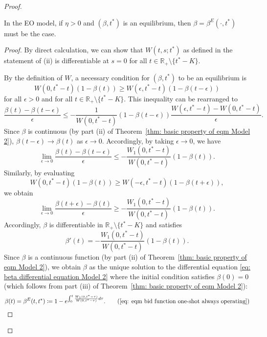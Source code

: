 \documentclass[12pt, letterpaper]{article}
\begin{document}
\begin{proof}
\begin{lem}\label{lem: equilibrium necessity model 2}
In the EO model, if $\eta > 0$ and $(\beta, t^*)$ is an equilibrium, then $\beta = \beta^E(\cdot, t^*)$ must be the case.
\end{lem}

\begin{proof}
By direct calculation, we can show that $W(t, s; t^*)$
as defined in the statement of (ii) is differentiable at $s = 0$ for all $t \in \mathbb{R}_+\setminus\{t^* - K\}$.

By the definition of $W$, a necessary condition for $(\beta,t^*)$ to be an equilibrium is
\begin{equation}
    W(0, t^* - t) (1-\beta(t)) \ge W(\epsilon, t^* - t) (1 - \beta(t - \epsilon))
\end{equation}
for all $\epsilon > 0$ and for all $t \in \mathbb{R}_+\setminus\{t^* - K\}$. This inequality can be rearranged to
\begin{equation}
    \frac{\beta(t) - \beta(t-\epsilon)}{\epsilon} \le - \frac{1}{W(0, t^* - t)} (1 - \beta(t-\epsilon)) \frac{W(\epsilon, t^* - t) - W(0, t^* - t)}{\epsilon}.
\end{equation}
Since $\beta$ is continuous (by part (ii) of Theorem~\ref{thm: basic property of eqm Model 2}), $\beta(t - \epsilon) \to \beta(t)$ as $\epsilon \to 0$. Accordingly, by taking $\epsilon \to 0$, we have
\begin{equation}
    \lim_{\epsilon \to 0}  \frac{\beta(t) - \beta(t-\epsilon)}{\epsilon} \le - \frac{W_1(0, t^* - t)}{W(0, t^* - t)} (1 - \beta(t)).
\end{equation}
Similarly, by evaluating
\begin{equation}
    W(0, t^* - t) (1 -\beta(t)) \ge W(-\epsilon, t^* - t) (1 -\beta(t+\epsilon)),
\end{equation}
we obtain
\begin{equation}
    \lim_{\epsilon \to 0}  \frac{\beta(t+\epsilon) - \beta(t)}{\epsilon} \ge - \frac{W_1(0, t^* - t)}{W(0, t^* - t)} (1 - \beta(t)).
\end{equation}
Accordingly, $\beta$ is differentiable in $\mathbb{R}_+\setminus\{t^* - K\}$ and satisfies
\begin{equation}\label{eq: beta differential equation Model 2}
    \beta'(t) = - \frac{W_1(0, t^* - t)}{W(0, t^* - t)} (1 - \beta(t)).
\end{equation}
Since $\beta$ is a continuous function (by part (ii) of Theorem~\ref{thm: basic property of eqm Model 2}), we obtain $\beta$ as the unique solution to the differential equation \eqref{eq: beta differential equation Model 2} where  the initial condition satisfies $\beta(0) = 0$ (which follows from part (iii) of Theorem~\ref{thm: basic property of eqm Model 2}):
\begin{equation}
    \beta(t) = \beta^E(t, t^*) \coloneqq  1 - e^{\int_0^t \frac{W_1(0, t^* - \tau)}{W(0, t^* - \tau)}d\tau}.\tag{\ref{eq: eqm bid function one-shot always operating}}
\end{equation}
\end{proof}


\end{proof} %
\end{document}
